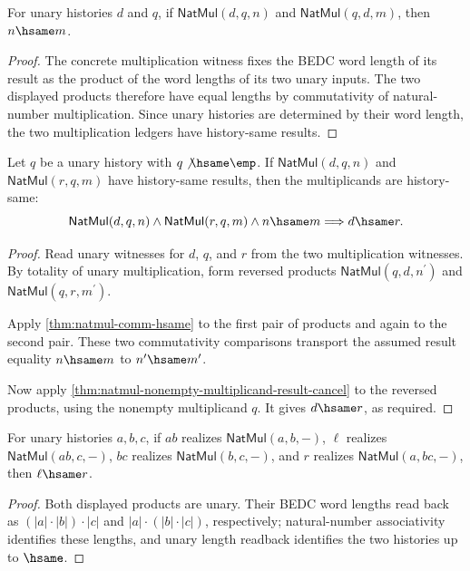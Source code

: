 \begin{theorem}
\label{thm:natmul-comm-hsame}
For unary histories \(d\) and \(q\), if \(\mathsf{NatMul}(d,q,n)\) and
\(\mathsf{NatMul}(q,d,m)\), then \(n\hsame m\).
\end{theorem}
\begin{proof}
The concrete multiplication witness fixes the BEDC word length of its result
as the product of the word lengths of its two unary inputs. The two displayed
products therefore have equal lengths by commutativity of natural-number
multiplication. Since unary histories are determined by their word length, the
two multiplication ledgers have history-same results.
\end{proof}

\begin{theorem}
\label{thm:natmul-nonempty-multiplier-result-cancel}
Let $q$ be a unary history with $q\not\hsame\emp$. If
$\mathsf{NatMul}(d,q,n)$ and $\mathsf{NatMul}(r,q,m)$ have history-same
results, then the multiplicands are history-same:
$$
\mathsf{NatMul}(d,q,n)\land\mathsf{NatMul}(r,q,m)\land n\hsame m
\Longrightarrow d\hsame r.
$$
\end{theorem}
\begin{proof}
Read unary witnesses for $d$, $q$, and $r$ from the two multiplication
witnesses. By totality of unary multiplication, form reversed products
$\mathsf{NatMul}(q,d,n^{\prime})$ and
$\mathsf{NatMul}(q,r,m^{\prime})$.

Apply \autoref{thm:natmul-comm-hsame} to the first pair of products and again
to the second pair. These two commutativity comparisons transport the assumed
result equality $n\hsame m$ to $n^{\prime}\hsame m^{\prime}$.

Now apply \autoref{thm:natmul-nonempty-multiplicand-result-cancel} to the
reversed products, using the nonempty multiplicand $q$. It gives
$d\hsame r$, as required.
\end{proof}

\begin{theorem}
\label{thm:natmul-assoc-hsame}
For unary histories \(a,b,c\), if \(ab\) realizes \(\mathsf{NatMul}(a,b,-)\),
\(\ell\) realizes \(\mathsf{NatMul}(ab,c,-)\), \(bc\) realizes
\(\mathsf{NatMul}(b,c,-)\), and \(r\) realizes \(\mathsf{NatMul}(a,bc,-)\),
then \(\ell\hsame r\).
\end{theorem}
\begin{proof}
Both displayed products are unary. Their BEDC word lengths read back as
\((|a|\cdot |b|)\cdot |c|\) and \(|a|\cdot(|b|\cdot |c|)\), respectively;
natural-number associativity identifies these lengths, and unary length
readback identifies the two histories up to \(\hsame\).
\end{proof}

